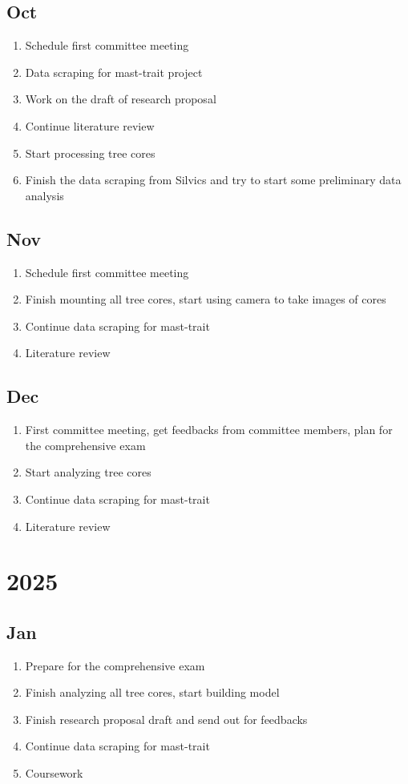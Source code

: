 \documentclass[12pt,letter]{article}
\begin{document}
\subsection{Oct}	
\begin{enumerate}
	\item Schedule first committee meeting
	\item Data scraping for mast-trait project
	\item Work on the draft of research proposal
	\item Continue literature review
	\item Start processing tree cores
	\item Finish the data scraping from Silvics and try to start some preliminary data analysis
	\end{enumerate}
\subsection{Nov}	
\begin{enumerate}
	\item Schedule first committee meeting
	\item Finish mounting all tree cores, start using camera to take images of cores
	\item Continue data scraping for mast-trait
	\item Literature review
	\end{enumerate}	
\subsection{Dec}	
\begin{enumerate}
	\item First committee meeting, get feedbacks from committee members, plan for the comprehensive exam
	\item Start analyzing tree cores
	\item Continue data scraping for mast-trait
	\item Literature review
	\end{enumerate}	
\section{2025}
\subsection{Jan}
\begin{enumerate}
	\item Prepare for the comprehensive exam
	\item Finish analyzing all tree cores, start building model
	\item Finish research proposal draft and send out for feedbacks
	\item Continue data scraping for mast-trait
	\item Coursework
	\end{enumerate}
\end{document}
